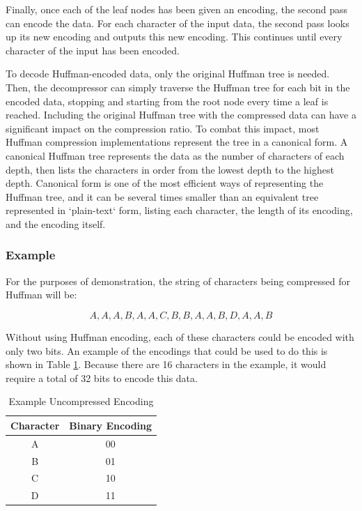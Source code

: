 \documentclass[doublespace,nopageskip]{VTthesis}
\begin{document}
Finally, once each of the leaf nodes has been given an encoding, the second pass can encode the data. For each character of the input data, the second pass looks up its new encoding and outputs this new encoding. This continues until every character of the input has been encoded.

To decode Huffman-encoded data, only the original Huffman tree is needed. Then, the decompressor can simply traverse the Huffman tree for each bit in the encoded data, stopping and starting from the root node every time a leaf is reached. Including the original Huffman tree with the compressed data can have a significant impact on the compression ratio. To combat this impact, most Huffman compression implementations represent the tree in a canonical form. A canonical Huffman tree represents the data as the number of characters of each depth, then lists the characters in order from the lowest depth to the highest depth. Canonical form is one of the most efficient ways of representing the Huffman tree, and it can be several times smaller than an equivalent tree represented in `plain-text` form, listing each character, the length of its encoding, and the encoding itself.

\subsubsection{Example}\label{sss:huffman_example}
For the purposes of demonstration, the string of characters being compressed for Huffman will be:

\[A,A,A,B,A,A,C,B,B,A,A,B,D,A,A,B\]

Without using Huffman encoding, each of these characters could be encoded with only two bits. An example of the encodings that could be used to do this is shown in Table \ref{tab:default_encoding}. Because there are 16 characters in the example, it would require a total of 32 bits to encode this data.

\begin{table}[htb]
	\centering
	\caption{Example Uncompressed Encoding}
	\begin{tabular}{cc}
	    \toprule
	    Character & Binary Encoding\\
	    \midrule
	    A & 00 \\
	    \midrule
	    B & 01 \\
	    \midrule
	    C & 10 \\
	    \midrule
	    D & 11 \\
	    \bottomrule
	\end{tabular}
	\label{tab:default_encoding}
\end{table}
\end{document}
